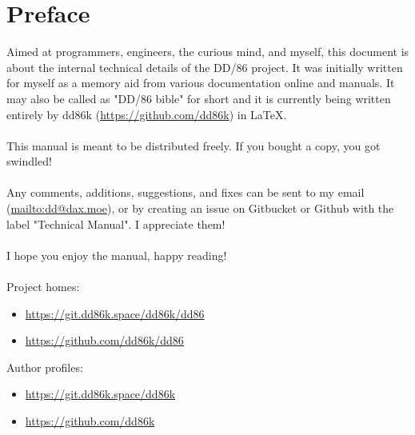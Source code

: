 \chapter*{Preface}

Aimed at programmers, engineers, the curious mind, and myself, this document is
about the internal technical details of the DD/86 project. It was initially
written for myself as a memory aid from various documentation online and
manuals. It may also be called as "DD/86 bible" for short and it is currently
being written entirely by dd86k (\url{https://github.com/dd86k}) in \LaTeX.
\\\\
This manual is meant to be distributed freely. If you bought a copy, you got
swindled!
\\\\
Any comments, additions, suggestions, and fixes can be sent to my email
(\url{mailto:dd@dax.moe}), or by creating an issue on Gitbucket or Github with
the label "Technical Manual". I appreciate them!
\\\\
I hope you enjoy the manual, happy reading!
\\\\
Project homes:
\begin{itemize}
\item \url{https://git.dd86k.space/dd86k/dd86}
\item \url{https://github.com/dd86k/dd86}
\end{itemize}
Author profiles:
\begin{itemize}
\item \url{https://git.dd86k.space/dd86k}
\item \url{https://github.com/dd86k}
\end{itemize}